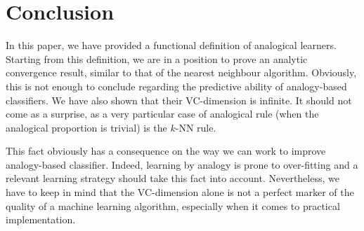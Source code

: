 \section{Conclusion}\label{conc}

In this paper, we have provided a  functional definition of analogical
learners.  Starting from this definition, we are in a position to prove an
analytic convergence result, similar to that of the nearest neighbour
algorithm. Obviously, this is not enough to conclude regarding the predictive
ability of analogy-based classifiers. We have also shown that their
VC\mbox{-}dimension is infinite.  It should not come as a surprise, as a very
particular case of analogical rule (when the analogical proportion is trivial)
is the $k$-NN rule.

This fact obviously has a consequence on the way we can
work to improve analogy-based classifier.  Indeed, learning by analogy is prone
to over-fitting and a relevant learning strategy should take this fact into
account.  Nevertheless, we have to keep in mind that the VC\mbox{-}dimension
alone is not a perfect marker of the quality of a machine learning algorithm,
especially when it comes
to practical implementation.

